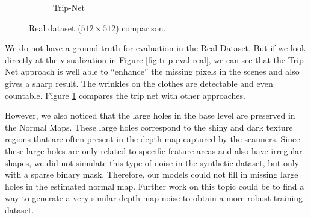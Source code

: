 \begin{figure}[H]
\begin{subfigure}[b]{0.24\linewidth}
		\caption{Trip-Net}
	\end{subfigure}	
	\decoRule
	\caption{Real dataset ($ 512\times 512 $) comparison.}
	\label{fig:real_eval_compare}
\end{figure}


We do not have a ground truth for evaluation in the Real-Dataset. But if we look directly at the visualization in Figure \ref{fig:trip-eval-real}, we can see that the Trip-Net approach is well able to ``enhance'' the missing pixels in the scenes and also gives a sharp result. The wrinkles on the clothes are detectable and even countable. Figure \ref{fig:real_eval_compare} compares the trip net with other approaches.


However, we also noticed that the large holes in the base level are preserved in the Normal Maps. These large holes correspond to the shiny and dark texture regions that are often present in the depth map captured by the scanners. Since these large holes are only related to specific feature areas and also have irregular shapes, we did not simulate this type of noise in the synthetic dataset, but only with a sparse binary mask. Therefore, our models could not fill in missing large holes in the estimated normal map. Further work on this topic could be to find a way to generate a very similar depth map noise to obtain a more robust training dataset. 


